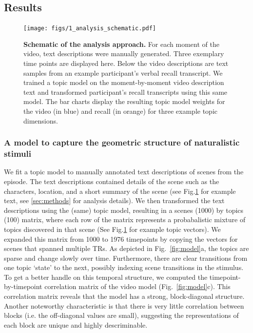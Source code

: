 \documentclass{article}
\begin{document}
{\subsection{Results}

\begin{figure}[t!]
\centering
\texttt{[image: figs/1\_analysis\_schematic.pdf]}
\caption{\small \textbf{Schematic of the analysis approach.} For each moment of the video, text descriptions were manually generated. Three exemplary time points are displayed here.  Below the video descriptions are text samples from an example participant's verbal recall transcript.  We trained a topic model on the moment-by-moment video description text and transformed participant's recall transcripts using this same model. The bar charts display the resulting topic model weights for the video (in blue) and recall (in orange) for three example topic dimensions.}
\label{fig:schematic}
\end{figure}

\subsubsection{A model to capture the geometric structure of naturalistic stimuli}
We fit a topic model \citep{BleiEtal03} to manually annotated text descriptions of scenes from the episode. The text descriptions contained details of the scene such as the characters, location, and a short summary of the scene (see Fig.\ref{fig:schematic} for example text, see \ref{sec:methods} for analysis details). We then transformed the text descriptions using the (same) topic model, resulting in a scenes (1000) by topics (100) matrix, where each row of the matrix represents a probabalistic mixture of topics discovered in that scene (See Fig.\ref{fig:schematic} for example topic vectors). We expanded this matrix from 1000 to 1976 timepoints by copying the vectors for scenes that spanned multiple TRs. As depicted in Fig.~\ref{fig:model}a, the topics are sparse and change slowly over time. Furthermore, there are clear transitions from one topic `state' to the next, possibly indexing scene transitions in the stimulus. To get a better handle on this temporal structure, we computed the timepoint-by-timepoint correlation matrix of the video model (Fig.~\ref{fig:model}c).  This correlation matrix reveals that the model has a strong, block-diagonal structure. Another noteworthy characteristic is that there is very little correlation between blocks (i.e. the off-diagonal values are small), suggesting the representations of each block are unique and highly descriminable.

}
\end{document}

